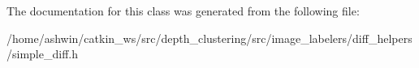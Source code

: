 The documentation for this class was generated from the following file\+:\begin{DoxyCompactItemize}
\item 
/home/ashwin/catkin\+\_\+ws/src/depth\+\_\+clustering/src/image\+\_\+labelers/diff\+\_\+helpers/simple\+\_\+diff.\+h\end{DoxyCompactItemize}

